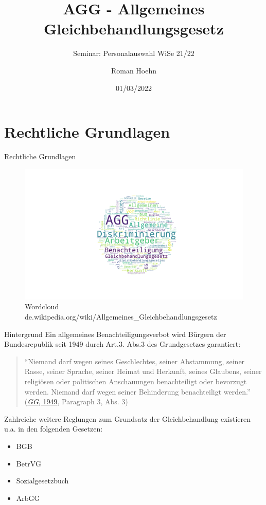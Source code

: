 \documentclass[
  10pt,
  ngerman,
  ignorenonframetext,
]{beamer}
\title{AGG - Allgemeines Gleichbehandlungsgesetz}
\subtitle{Seminar: Personalauswahl WiSe 21/22}
\author{Roman Hoehn}
\date{01/03/2022}
\providecommand{\tightlist}{%
  \setlength{\itemsep}{0pt}\setlength{\parskip}{0pt}}
\begin{document}
\frame{\titlepage}

\begin{frame}[allowframebreaks]
  \tableofcontents[hideallsubsections]
\end{frame}
\hypertarget{rechtliche-grundlagen}{%
\section{Rechtliche Grundlagen}\label{rechtliche-grundlagen}}

\begin{frame}{Rechtliche Grundlagen}
\begin{figure}
\centering
\includegraphics{plots/fig1.png}
\caption{Wordcloud
de.wikipedia.org/wiki/Allgemeines\_Gleichbehandlungsgesetz}
\end{figure}
\end{frame}

\begin{frame}{Hintergrund}
\protect\hypertarget{hintergrund}{}
Ein allgemeines Benachteiligungsverbot wird Bürgern der Bundesrepublik
seit 1949 durch Art.3. Abs.3 des Grundgesetzes garantiert:

\begin{quote}
``Niemand darf wegen seines Geschlechtes, seiner Abstammung, seiner
Rasse, seiner Sprache, seiner Heimat und Herkunft, seines Glaubens,
seiner religiösen oder politischen Anschauungen benachteiligt oder
bevorzugt werden. Niemand darf wegen seiner Behinderung benachteiligt
werden.'' (\protect\hyperlink{ref-gg}{\emph{GG}, 1949}, Paragraph 3,
Abs. 3)
\end{quote}

Zahlreiche weitere Reglungen zum Grundsatz der Gleichbehandlung
existieren u.a. in den folgenden Gesetzen:

\begin{itemize}
\tightlist
\item
  BGB
\item
  BetrVG
\item
  Sozialgesetzbuch
\item
  ArbGG
\end{itemize}
\end{frame}
\end{document}
